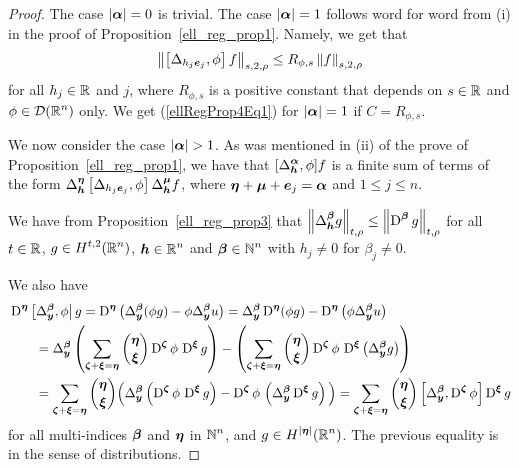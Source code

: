 \begin{proof}
The case $|{\bm{\alpha}}|=0$ is trivial.
The case $|{\bm{\alpha}}|=1$ follows word for word from (i) in the proof of
Proposition~\ref{ell_reg_prop1}.  Namely, we get that
\[
\left\| \left[ \Delta_{h_j{\bm{e}}_j} ,\phi \right] f \right\|_{s,2,\rho}
\leq R_{\phi,s} \left\| f \right\|_{s,2,\rho}
\]
for all $h_j \in \mathbb{R}$ and $j$, where $R_{\phi,s}$ is a positive constant that
depends on $s\in \mathbb{R}$ and $\displaystyle \phi \in \mathcal{D}(\mathbb{R}^n)$ only.  We get
(\ref{ellRegProp4Eq1}) for $|{\bm{\alpha}}|=1$ if $C=R_{\phi,s}$.

We now consider the case $|\VEC{\alpha}|>1$.  As was mentioned
in (ii) of the prove of Proposition~\ref{ell_reg_prop1}, we have that
$\displaystyle [\Delta^{{\bm{\alpha}}}_{{\bm{h}}}, \phi] f$
is a finite sum of terms of the form
$\displaystyle \Delta^{{\bm{\eta}}}_{{\bm{h}}} \left[
\Delta_{h_j {\bm{e}}_j}, \phi\right] \Delta^{{\bm{\mu}}}_{{\bm{h}}} f$,
where ${\bm{\eta}}+{\bm{\mu}}+{\bm{e}}_j = {\bm{\alpha}}$ and $1\leq j \leq n$.

We have from Proposition~\ref{ell_reg_prop3} that
$\displaystyle \left\| \Delta^{{\bm{\beta}}}_{{\bm{h}}} g \right\|_{t,\rho}
\leq \left\| \operatorname{D}^{{\bm{\beta}}} g \right\|_{t,\rho}$
for all $t\in \mathbb{R}$, $\displaystyle g \in H^{t,2}(\mathbb{R}^n)$,
$\displaystyle {\bm{h}} \in \mathbb{R}^n$ and $\displaystyle {\bm{\beta}} \in \mathbb{N}^n$
with $h_j \neq 0$ for $\beta_j \neq 0$.

We also have
\begin{align*}
&\operatorname{D}^{{\bm{\eta}}}\left[ \Delta^{{\bm{\beta}}}_{{\bm{y}}}, \phi\right| g
= \operatorname{D}^{{\bm{\eta}}} \left( \Delta^{{\bm{\beta}}}_{{\bm{y}}} (\phi g) - \phi
\Delta^{{\bm{\beta}}}_{{\bm{y}}} u \right)
= \Delta^{{\bm{\beta}}}_{{\bm{y}}} \operatorname{D}^{{\bm{\eta}}}(\phi g)
- \operatorname{D}^{{\bm{\eta}}} \left(\phi
\Delta^{{\bm{\beta}}}_{{\bm{y}}} u \right) \\
&\qquad
= \Delta^{{\bm{\beta}}}_{{\bm{y}}} \left(\sum_{{\bm{\zeta}}+{\bm{\xi}} = {\bm{\eta}}}
\binom{{\bm{\eta}}}{{\bm{\xi}}}
\operatorname{D}^{{\bm{\zeta}}} \phi \, \operatorname{D}^{{\bm{\xi}}} g \right)
- \left(\sum_{{\bm{\zeta}}+{\bm{\xi}} = {\bm{\eta}}}
\binom{{\bm{\eta}}}{{\bm{\xi}}} \operatorname{D}^{{\bm{\zeta}}} \phi \,
\operatorname{D}^{{\bm{\xi}}} \left( \Delta^{{\bm{\beta}}}_{{\bm{y}}} g \right) \right) \\
&\qquad
= \sum_{{\bm{\zeta}}+{\bm{\xi}} = {\bm{\eta}}} \binom{{\bm{\eta}}}{{\bm{\xi}}} \Big(
\Delta^{{\bm{\beta}}}_{{\bm{y}}} \left( \operatorname{D}^{{\bm{\zeta}}} \phi \,
\operatorname{D}^{{\bm{\xi}}} g \right)
- \operatorname{D}^{{\bm{\zeta}}} \phi \, \left( \Delta^{{\bm{\beta}}}_{{\bm{y}}}
\operatorname{D}^{{\bm{\xi}}} g \right) \Big)
= \sum_{{\bm{\zeta}}+{\bm{\xi}} = {\bm{\eta}}} \binom{{\bm{\eta}}}{{\bm{\xi}}}
\left[ \Delta^{{\bm{\beta}}}_{{\bm{y}}} , \operatorname{D}^{{\bm{\zeta}}} \phi \right]
\operatorname{D}^{{\bm{\xi}}} g
\end{align*}
for all multi-indices ${\bm{\beta}}$ and ${\bm{\eta}}$ in $\displaystyle \mathbb{N}^n$,
and $\displaystyle g \in H^{|{\bm{\eta}}|}(\mathbb{R}^n)$. The previous
equality is in the sense of distributions.


\end{proof}
